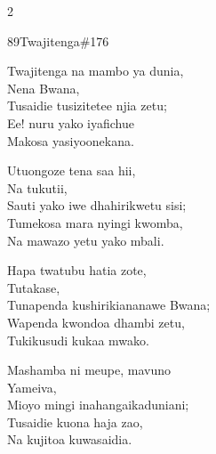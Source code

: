 \documentclass{article}
\begin{document}
\begin{multicols}{2}
\begin{hymn}{89}{Twajitenga}{\#176}
\begin{stanza}
Twajitenga na mambo ya dunia,\\
Nena Bwana,\\
Tusaidie tusizitetee njia zetu;\\
Ee! nuru yako iyafichue\\
Makosa yasiyoonekana.
\end{stanza}
\begin{stanza}
Utuongoze tena saa hii,\\
Na tukutii,\\
Sauti yako iwe dhahirikwetu sisi;\\
Tumekosa mara nyingi kwomba,\\
Na mawazo yetu yako mbali.
\end{stanza}
\begin{stanza}
Hapa twatubu hatia zote,\\
Tutakase,\\
Tunapenda kushirikiananawe Bwana;\\
Wapenda kwondoa dhambi zetu,\\
Tukikusudi kukaa mwako.
\end{stanza}
\begin{stanza}
Mashamba ni meupe, mavuno\\
Yameiva,\\
Mioyo mingi inahangaikaduniani;\\
Tusaidie kuona haja zao,\\
Na kujitoa kuwasaidia.
\end{stanza}
\end{hymn}


\end{multicols}
\end{document}
